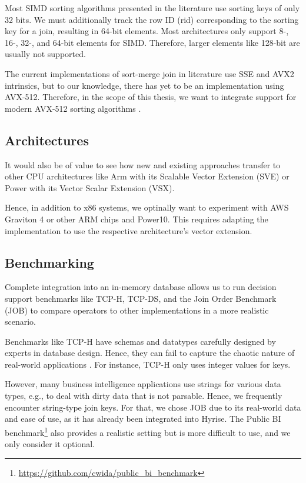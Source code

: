 Most SIMD sorting algorithms presented in the literature use sorting keys of only 32 bits. We must additionally track the row ID
(rid) corresponding to the sorting key for a join, resulting in 64-bit elements. Most architectures
only support 8-, 16-, 32-, and 64-bit elements for SIMD. Therefore, larger elements like 128-bit are
usually not supported.

The current implementations of sort-merge join in literature use SSE and AVX2 intrinsics, but to
our knowledge, there has yet to be an implementation using AVX-512. Therefore, in the scope of
this thesis, we want to integrate support for modern AVX-512 sorting algorithms \cite{Watkins, 8855628}. 

\subsection{Architectures}
It would also be of value to see how new and existing approaches transfer to other CPU
architectures like Arm with its Scalable Vector Extension (SVE) or Power with its Vector Scalar
Extension (VSX).

Hence, in addition to x86 systems, we optinally want to experiment with AWS Graviton 4 or other ARM chips
and Power10. This requires adapting 
the implementation to use the respective architecture's
vector extension.


\subsection{Benchmarking}
Complete integration into an in-memory database allows us to run decision support benchmarks
like TCP-H, TCP-DS, and the Join Order Benchmark (JOB) \cite{DBLP:journals/pvldb/LeisGMBK015} to
compare operators to other implementations in a more realistic scenario.

Benchmarks like TCP-H have schemas and datatypes carefully designed by experts in database design.
Hence, they can fail to capture the chaotic nature of real-world applications \cite{10.1145/3209950.3209952}.
For instance, TCP-H only uses integer values for keys. 

However, many business intelligence applications use strings for various data types, e.g., to deal
with dirty data that is not parsable. Hence, we frequently encounter string-type join keys. For
that, we chose JOB due to its real-world data and ease of use, as it 
has already been integrated into Hyrise. The Public BI benchmark\footnote{\url{https://github.com/cwida/public_bi_benchmark}}
also provides a realistic setting
but is more difficult to use, and we only consider it optional.

